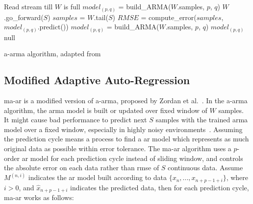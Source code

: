 \begin{algorithm}
\begin{algorithmic}[1]
\Input
\EndInput
\Output
\EndOutput

\State Read stream till $W$ is full 
\State $model_{(p, q)}$ = build\_ARMA($W$.samples, $p$, $q$)  
    \State $W$.go\_forward($S$) 
    \State $samples$ = $W$.tail($S$)
    \State $RMSE$ = compute\_error($samples$,  $model_{(p, q)}$.predict())
        \State $model_{(p, q)}$ = build\_ARMA($W$.samples, $p$, $q$)
        \State \Return $model_{(p, q)}$
    \Else
        \State \Return null 
    \EndIf
\EndWhile
\end{algorithmic}
\caption{\acrshort{a-arma} algorithm, adapted from~\cite{lu2010optimized}}
\label{algo:A-ARMA}
\end{algorithm}

\subsection{Modified Adaptive Auto-Regression}

\acrfull{ma-ar} is a modified version of \acrshort{a-arma}, proposed by Zordan
et al.~\cite{zordan2012compress}. In the \acrshort{a-arma} algorithm, the
\acrshort{arma} model is built or updated over fixed window of $W$ samples. It
might cause bad performance to predict next $S$ samples with the trained
\acrshort{arma} model over a fixed window, especially in highly noisy
environments~\cite{zordan2012compress}. Assuming the prediction cycle means a
process to find a \acrshort{ar} model which represents as much original data as
possible within error tolerance. The \acrshort{ma-ar} algorithm uses a $p$-order
\acrshort{ar} model for each prediction cycle instead of sliding window, and
controls the absolute error on each data rather than \acrshort{rmse} of $S$
continuous data. Assume $M^{(n, i)}$ indicates the \acrshort{ar} model built
according to data $\{x_n, ..., x_{n+p-1+i} \}$, where $i>0$, and
$\hat{x}_{n+p-1+i}$ indicates the predicted data, then for each prediction
cycle, \acrshort{ma-ar} works as follows:


